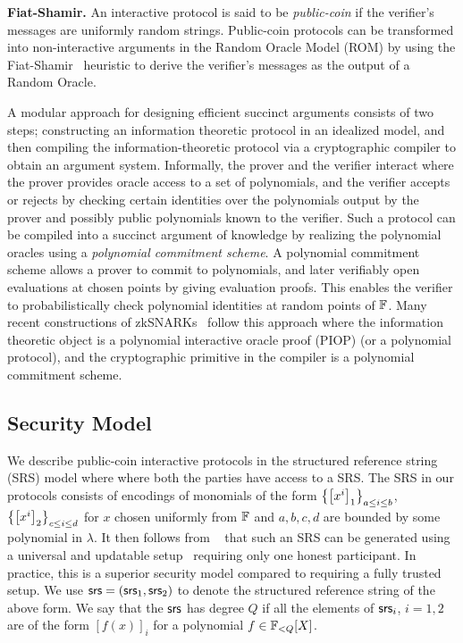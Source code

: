 \noindent\textbf{Fiat-Shamir.} An interactive protocol is said to be \emph{public-coin} if the verifier's messages are uniformly random strings. Public-coin protocols can be transformed into non-interactive arguments in the Random Oracle Model (ROM) by using the Fiat-Shamir~\cite{C:FiaSha86} heuristic to derive the verifier's messages as the output of a Random Oracle. 

A modular approach for designing efficient succinct arguments consists of two steps; constructing an information theoretic protocol in an idealized model, and then compiling the information-theoretic protocol via a cryptographic compiler to obtain an argument system. 
Informally, the prover and the verifier interact where the prover provides oracle access to a set of polynomials, and the verifier accepts or rejects by checking certain identities over the polynomials output by the prover and possibly public polynomials known to the verifier. Such a protocol can be compiled into a succinct argument of knowledge by realizing the polynomial oracles using a \emph{polynomial commitment scheme}. A polynomial commitment scheme allows a prover to commit to polynomials, and later verifiably open evaluations at chosen points by giving evaluation proofs. This enables the verifier to probabilistically
check polynomial identities at random points of $\mathbb{F}$. %
Many recent constructions of zkSNARKs~\cite{EC:BunFisSze20,EC:CHMMVW20,Gabizon2019PLONKPO} follow this approach where the information theoretic object is a polynomial interactive oracle proof (PIOP) (or a polynomial protocol), and the cryptographic primitive in the compiler is a polynomial commitment scheme.

\subsection{Security Model} We describe public-coin interactive protocols in the structured reference string (SRS) model where
where both the parties have access to a SRS. The SRS in our protocols consists of
encodings of monomials of the form $\left\{\left[{x^i}\right]_1\right\}_{a\leq i\leq b}$, $\left\{\left[{x^i}\right]_2\right\}_{c\leq i\leq d}$
for $x$ chosen uniformly from $\mathbb{F}$ and $a,b,c,d$ are bounded by some polynomial in $\lambda$. It then follows
from ~\cite{EPRINT:BowGabMie17} that such an SRS can be generated using a universal and updatable setup~\cite{C:GKMMM18} requiring
only one honest participant. In practice, this is a superior security model compared to requiring a fully
trusted setup. We use $\mathsf{srs} = (\mathsf{srs}_1,\mathsf{srs}_2)$ to denote the structured reference string of the above form. We say
that the $\mathsf{srs}$ has degree $Q$ if all the elements of $\mathsf{srs}_i$, $i=1,2$ are of the form $[f(x)]_i$ for a
polynomial $f\in \mathbb{F}_{<Q}[X]$.

